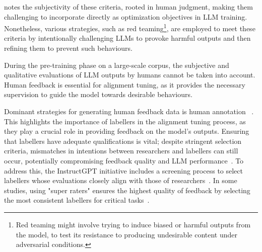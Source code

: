 \textcite{survey} notes the subjectivity of these criteria, rooted in human judgment, making them challenging to incorporate directly as optimization objectives in LLM training.
Nonetheless, various strategies, such as red teaming\footnote{Red teaming might involve trying to induce biased or harmful outputs from the model, to test its resistance to producing undesirable content under adversarial conditions.}, are employed to meet these criteria by intentionally challenging LLMs to provoke harmful outputs and then refining them to prevent such behaviours.

During the pre-training phase on a large-scale corpus, the subjective and qualitative evaluations of LLM outputs by humans cannot be taken into account.
Human feedback is essential for alignment tuning, as it provides the necessary supervision to guide the model towards desirable behaviours.

Dominant strategies for generating human feedback data is human annotation ~\cite{ouyang2022training, glaese2022improving, ziegler2019fine}.
This highlights the importance of labellers in the alignment tuning process, as they play a crucial role in providing feedback on the model's outputs.
Ensuring that labellers have adequate qualifications is vital; despite stringent selection criteria, mismatches in intentions between researchers and labellers can still occur, potentially compromising feedback quality and LLM performance~\cite{bender2021dangers}.
To address this, the InstructGPT initiative includes a screening process to select labellers whose evaluations closely align with those of researchers~\cite{ouyang2022training}.
In some studies, using "super raters" ensures the highest quality of feedback by selecting the most consistent labellers for critical tasks~\cite{glaese2022improving}.

